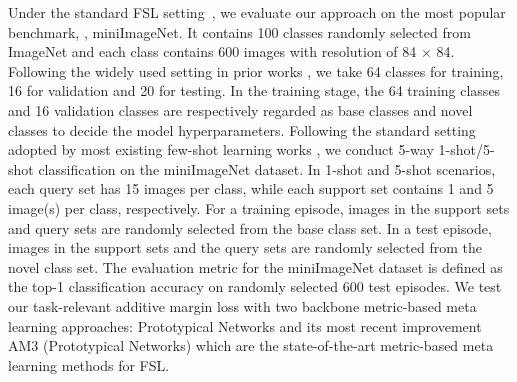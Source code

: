 \documentclass[10pt,twocolumn,letterpaper]{article}
\begin{document}
Under the standard FSL setting~\cite{Snell2017nips,vinyals2016bnips}, we evaluate our approach on the most popular benchmark, \ie,  miniImageNet. It contains 100 classes randomly selected from ImageNet \cite{Russakovsky2015ImageNet} and each class contains 600 images with resolution of 84 $\times$ 84. Following the widely used setting in prior works \cite{vinyals2016bnips,Snell2017nips}, we take 64 classes for training, 16 for validation and 20 for testing. In the training stage, the 64 training classes and 16 validation classes are respectively regarded as base classes and novel classes to decide the model hyperparameters. Following the standard setting adopted by most existing few-shot learning works \cite{vinyals2016bnips,Snell2017nips,Sung2018cvpr,Gidaris2018cvpr,Cai2018cvpr}, we conduct 5-way 1-shot/5-shot classification on the miniImageNet dataset. In 1-shot and 5-shot scenarios, each query set has 15 images per class, while each support set contains 1 and 5 image(s) per class, respectively. For a training episode, images in the support sets and query sets are randomly selected from the base class set. In a test episode, images in the support sets and the query sets are randomly selected from the novel class set. The evaluation metric for the miniImageNet dataset is defined as the top-1 classification accuracy on randomly selected 600 test episodes. We test our task-relevant additive margin loss with two backbone metric-based meta learning approaches:
Prototypical Networks \cite{Snell2017nips} and its most recent improvement AM3 (Prototypical Networks) \cite{Chen2019NIPS} which are the state-of-the-art  
metric-based meta learning methods for FSL. 
\end{document}
